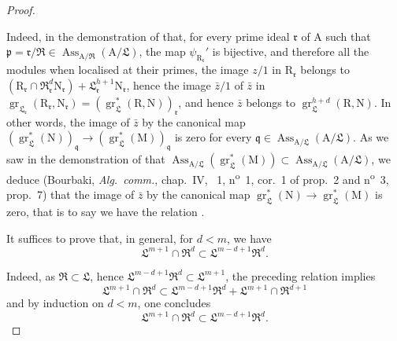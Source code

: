 \begin{proof}
\begin{env}[19.7.1.12]
\label{IV.19.7.1.12}
Indeed, in the demonstration of  that, for every prime ideal $\mathfrak{r}$ of $\mathrm{A}$ such that $\mathfrak{p}=\mathfrak{r}/\mathfrak{R}\in\operatorname{Ass}_{\mathrm{A}/\mathfrak{R}}(\mathrm{A}/\mathfrak{L})$, the map $\psi_{\mathrm{R}_\mathfrak{r}}'$ is bijective, and therefore all the modules when localised at their primes, the image $z/1$ in $\mathrm{R}_\mathfrak{r}$ belongs to $(\mathrm{R}_\mathfrak{r}\cap\mathfrak{R}_\mathfrak{r}^d\mathrm{N}_\mathfrak{r})+\mathfrak{L}_\mathfrak{r}^{h+1}\mathrm{N}_\mathfrak{r}$, hence the image $\bar{z}/1$ of $\bar{z}$ in $\operatorname{gr}_{\mathfrak{L}_\mathfrak{r}}(\mathrm{R}_\mathfrak{r},\mathrm{N}_\mathfrak{r})=(\operatorname{gr}_\mathfrak{L}^*(\mathrm{R},\mathrm{N}))_\mathfrak{r}$, and hence $\bar{z}$ belongs to $\operatorname{gr}_\mathfrak{L}^{h+d}(\mathrm{R},\mathrm{N})$. In other words, the image of $\bar{z}$ by the canonical map $(\operatorname{gr}_\mathfrak{L}^*(\mathrm{N}))_\mathfrak{q}\to(\operatorname{gr}_\mathfrak{L}^*(\mathrm{M}))_\mathfrak{q}$ is zero for every $\mathfrak{q}\in\operatorname{Ass}_{\mathrm{A}/\mathfrak{L}}(\mathrm{A}/\mathfrak{L})$. As we saw in the demonstration of  that $\operatorname{Ass}_{\mathrm{A}/\mathfrak{L}}(\operatorname{gr}_\mathfrak{L}^*(\mathrm{M}))\subset\operatorname{Ass}_{\mathrm{A}/\mathfrak{L}}(\mathrm{A}/\mathfrak{L})$, we deduce (Bourbaki, \emph{Alg.~comm.}, chap.~IV, \textsection~1, n\textsuperscript{o}~1, cor.~1 of prop.~2 and n\textsuperscript{o}~3, prop.~7) that the image of $\bar{z}$ by the canonical map $\operatorname{gr}_\mathfrak{L}^*(\mathrm{N})\to\operatorname{gr}_\mathfrak{L}^*(\mathrm{M})$ is zero, that is to say we have the relation .
\end{env}

\begin{env}[19.7.1.13]
\label{IV.19.7.1.13}
It suffices to prove that, in general, for $d<m$, we have
\[
  \mathfrak{L}^{m+1}\cap\mathfrak{R}^d\subset\mathfrak{L}^{m-d+1}\mathfrak{R}^d.
\]
\end{env}

Indeed, as $\mathfrak{R}\subset\mathfrak{L}$, hence $\mathfrak{L}^{m-d+1}\mathfrak{R}^d\subset\mathfrak{L}^{m+1}$, the preceding relation implies
\[
  \mathfrak{L}^{m+1}\cap\mathfrak{R}^d\subset\mathfrak{L}^{m-d+1}\mathfrak{R}^d+\mathfrak{L}^{m+1}\cap\mathfrak{R}^{d+1}
\]
and by induction on $d<m$, one concludes
\[
  \mathfrak{L}^{m+1}\cap\mathfrak{R}^d\subset\mathfrak{L}^{m-d+1}\mathfrak{R}^d.
\]


\end{proof}
